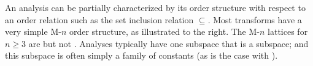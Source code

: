 
    \begin{minipage}{\tw-65mm}%
      An analysis can be partially characterized by its order structure with respect
      to an order relation such as the set inclusion relation $\subseteq$.
      Most transforms have a very simple M-$n$ order structure,
      as illustrated to the right.
      The M-$n$ lattices for $n\ge3$ are  but not .
      Analyses typically have one subspace that is a  subspace;
      and this subspace is often simply a family of constants
      (as is the case with ).
    \end{minipage}%
    \hfill%
    {\begin{minipage}{60mm}%
    \end{minipage}}%

